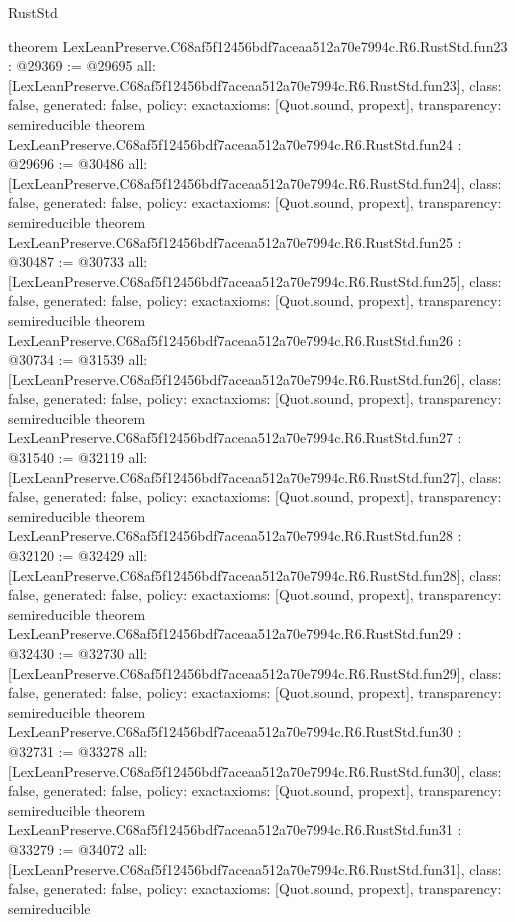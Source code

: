 \begin{lexlean}{RustStd}
\begin{coremodule}
{}
theorem LexLeanPreserve.C68af5f12456bdf7aceaa512a70e7994c.R6.RustStd.fun23 : @29369 := @29695 {
  all: [LexLeanPreserve.C68af5f12456bdf7aceaa512a70e7994c.R6.RustStd.fun23],
  class: false,
  generated: false,
  policy: exact{axioms: [Quot.sound, propext]},
  transparency: semireducible
}
theorem LexLeanPreserve.C68af5f12456bdf7aceaa512a70e7994c.R6.RustStd.fun24 : @29696 := @30486 {
  all: [LexLeanPreserve.C68af5f12456bdf7aceaa512a70e7994c.R6.RustStd.fun24],
  class: false,
  generated: false,
  policy: exact{axioms: [Quot.sound, propext]},
  transparency: semireducible
}
theorem LexLeanPreserve.C68af5f12456bdf7aceaa512a70e7994c.R6.RustStd.fun25 : @30487 := @30733 {
  all: [LexLeanPreserve.C68af5f12456bdf7aceaa512a70e7994c.R6.RustStd.fun25],
  class: false,
  generated: false,
  policy: exact{axioms: [Quot.sound, propext]},
  transparency: semireducible
}
theorem LexLeanPreserve.C68af5f12456bdf7aceaa512a70e7994c.R6.RustStd.fun26 : @30734 := @31539 {
  all: [LexLeanPreserve.C68af5f12456bdf7aceaa512a70e7994c.R6.RustStd.fun26],
  class: false,
  generated: false,
  policy: exact{axioms: [Quot.sound, propext]},
  transparency: semireducible
}
theorem LexLeanPreserve.C68af5f12456bdf7aceaa512a70e7994c.R6.RustStd.fun27 : @31540 := @32119 {
  all: [LexLeanPreserve.C68af5f12456bdf7aceaa512a70e7994c.R6.RustStd.fun27],
  class: false,
  generated: false,
  policy: exact{axioms: [Quot.sound, propext]},
  transparency: semireducible
}
theorem LexLeanPreserve.C68af5f12456bdf7aceaa512a70e7994c.R6.RustStd.fun28 : @32120 := @32429 {
  all: [LexLeanPreserve.C68af5f12456bdf7aceaa512a70e7994c.R6.RustStd.fun28],
  class: false,
  generated: false,
  policy: exact{axioms: [Quot.sound, propext]},
  transparency: semireducible
}
theorem LexLeanPreserve.C68af5f12456bdf7aceaa512a70e7994c.R6.RustStd.fun29 : @32430 := @32730 {
  all: [LexLeanPreserve.C68af5f12456bdf7aceaa512a70e7994c.R6.RustStd.fun29],
  class: false,
  generated: false,
  policy: exact{axioms: [Quot.sound, propext]},
  transparency: semireducible
}
theorem LexLeanPreserve.C68af5f12456bdf7aceaa512a70e7994c.R6.RustStd.fun30 : @32731 := @33278 {
  all: [LexLeanPreserve.C68af5f12456bdf7aceaa512a70e7994c.R6.RustStd.fun30],
  class: false,
  generated: false,
  policy: exact{axioms: [Quot.sound, propext]},
  transparency: semireducible
}
theorem LexLeanPreserve.C68af5f12456bdf7aceaa512a70e7994c.R6.RustStd.fun31 : @33279 := @34072 {
  all: [LexLeanPreserve.C68af5f12456bdf7aceaa512a70e7994c.R6.RustStd.fun31],
  class: false,
  generated: false,
  policy: exact{axioms: [Quot.sound, propext]},
  transparency: semireducible
}
\end{coremodule}
\end{lexlean}

